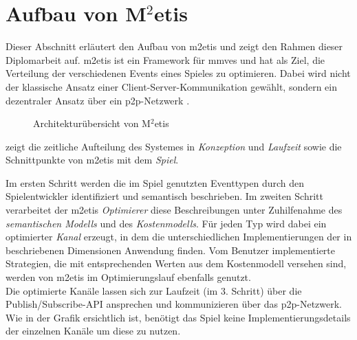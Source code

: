 \section{Aufbau von M$^2$etis}
\label{chap:grundlagen:aufbau_metis}

Dieser Abschnitt erläutert den Aufbau von \ac{m2etis}  und zeigt den Rahmen dieser Diplomarbeit auf. \ac{m2etis} ist ein Framework für \acp{mmve} und hat als Ziel, die Verteilung der verschiedenen Events eines Spieles zu optimieren. Dabei wird nicht der klassische Ansatz einer Client-Server-Kommunikation gewählt, sondern ein dezentraler Ansatz über ein \ac{p2p}-Netzwerk \cite{Fischer2010a, Fischer2010Event}.

\begin{figure}[htbp]
\centering
{}
\caption{Architekturübersicht von M$^2$etis}
\label{fig:metis_aufbau}
\end{figure}

 zeigt die zeitliche Aufteilung des Systemes in \emph{Konzeption} und \emph{Laufzeit} sowie die Schnittpunkte von \ac{m2etis} mit dem \emph{Spiel}.

Im ersten Schritt werden die im Spiel genutzten Eventtypen durch den Spielentwickler identifiziert und semantisch beschrieben. Im zweiten Schritt verarbeitet der \ac{m2etis} \emph{Optimierer} diese Beschreibungen unter Zuhilfenahme des \emph{semantischen Modells} und des \emph{Kostenmodells}. Für jeden Typ wird dabei ein optimierter \emph{Kanal} erzeugt, in dem die unterschiedlichen Implementierungen der in \cite{Fischer2010a} beschriebenen Dimensionen Anwendung finden. Vom Benutzer implementierte Strategien, die mit entsprechenden Werten aus dem Kostenmodell versehen sind, werden von \ac{m2etis} im Optimierungslauf ebenfalls genutzt.\\
Die optimierte Kanäle lassen sich zur Laufzeit (im 3. Schritt) über die Publish/Subscribe-API ansprechen und kommunizieren über das \ac{p2p}-Netzwerk. Wie in der Grafik ersichtlich ist, benötigt das Spiel keine Implementierungsdetails der einzelnen Kanäle um diese zu nutzen.

